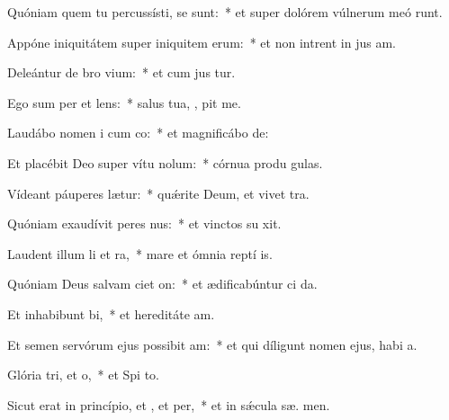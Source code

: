 \item Quóniam quem tu percussísti, se sunt:~* et super dolórem vúlnerum meó runt.
\item Appóne iniquitátem super iniquitem erum:~* et non intrent in jus am.
\item Deleántur de bro vium:~* et cum jus  tur.
\item Ego sum per et lens:~* salus tua, , pit me.
\item Laudábo nomen i cum co:~* et magnificábo   de:
\item Et placébit Deo super vítu nolum:~* córnua produ  gulas.
\item Vídeant páuperes  lætur:~* quǽrite Deum, et vivet  tra.
\item Quóniam exaudívit peres nus:~* et vinctos su  xit.
\item Laudent illum li et ra,~* mare et ómnia reptí  is.
\item Quóniam Deus salvam ciet on:~* et ædificabúntur ci da.
\item Et inhabibunt bi,~* et hereditáte  am.
\item Et semen servórum ejus possibit am:~* et qui díligunt nomen ejus, habi  a.
\item Glória tri, et o,~* et Spi to.
\item Sicut erat in princípio, et , et per,~* et in sǽcula sæ. men.
